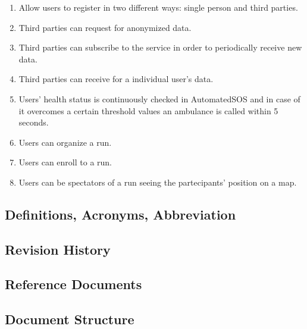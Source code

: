 \documentclass[a4paper]{article}
\begin{document}
    \begin{enumerate}[label*={G.\arabic*}]
        
        
        \item Allow users to register in two different ways: single person and third parties.
        
        \item Third parties can request for anonymized data.
    
        \item Third parties can subscribe to the service in order to periodically receive new data.
            
        \item Third parties can receive for a individual user's data.
        
        \item Users' health status is continuously checked in AutomatedSOS and in case of it overcomes a certain threshold values an ambulance is called within 5 seconds.
        
        \item Users can organize a run.
        \item Users can enroll to a run.
        \item Users can be spectators of a run seeing the partecipants' position on a map.
        
    \end{enumerate}
    
    \subsection{Definitions, Acronyms, Abbreviation}
    
    
    \subsection{Revision History}
    
    \subsection{Reference Documents}
    
    \subsection{Document Structure}
    
\end{document}
